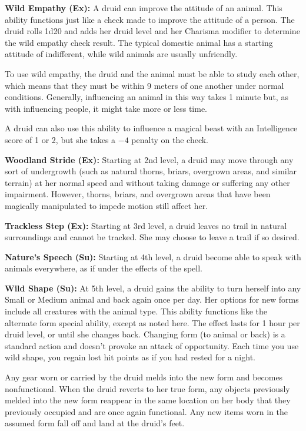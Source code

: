 \textbf{Wild Empathy (Ex):} A druid can improve the attitude of an animal. This ability functions just like a  check made to improve the attitude of a person. The druid rolls 1d20 and adds her druid level and her Charisma modifier to determine the wild empathy check result. The typical domestic animal has a starting attitude of indifferent, while wild animals are usually unfriendly.

To use wild empathy, the druid and the animal must be able to study each other, which means that they must be within 9 meters of one another under normal conditions. Generally, influencing an animal in this way takes 1 minute but, as with influencing people, it might take more or less time.

A druid can also use this ability to influence a magical beast with an Intelligence score of 1 or 2, but she takes a $-4$ penalty on the check.

\textbf{Woodland Stride (Ex):} Starting at 2nd level, a druid may move through any sort of undergrowth (such as natural thorns, briars, overgrown areas, and similar terrain) at her normal speed and without taking damage or suffering any other impairment. However, thorns, briars, and overgrown areas that have been magically manipulated to impede motion still affect her.

\textbf{Trackless Step (Ex):} Starting at 3rd level, a druid leaves no trail in natural surroundings and cannot be tracked. She may choose to leave a trail if so desired.

\textbf{Nature's Speech (Su):} Starting at 4th level, a druid become able to speak with animals everywhere, as if under the effects of the  spell.

\textbf{Wild Shape (Su):} At 5th level, a druid gains the ability to turn herself into any Small or Medium animal and back again once per day. Her options for new forms include all creatures with the animal type. This ability functions like the alternate form special ability, except as noted here. The effect lasts for 1 hour per druid level, or until she changes back. Changing form (to animal or back) is a standard action and doesn't provoke an attack of opportunity. Each time you use wild shape, you regain lost hit points as if you had rested for a night.

Any gear worn or carried by the druid melds into the new form and becomes nonfunctional. When the druid reverts to her true form, any objects previously melded into the new form reappear in the same location on her body that they previously occupied and are once again functional. Any new items worn in the assumed form fall off and land at the druid's feet.

